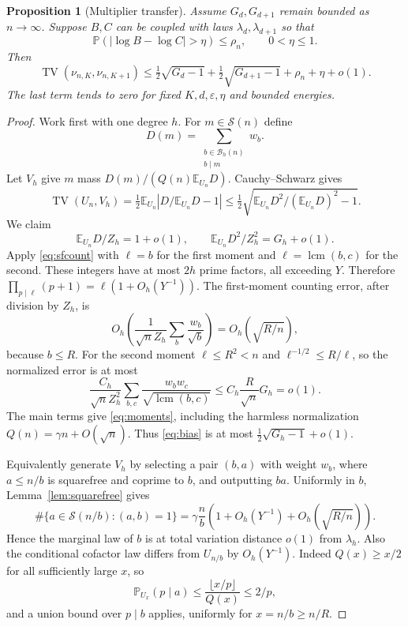 \documentclass[11pt]{article}
\newtheorem{proposition}[theorem]{Proposition}
\theoremstyle{remark}\newtheorem{remark}[theorem]{Remark}
\DeclareMathOperator{\TV}{TV}
\DeclareMathOperator{\lcm}{lcm}
\newcommand{\E}{\mathbb E}
\newcommand{\Prob}{\mathbb P}
\newcommand{\sfset}{\mathcal S}
\begin{document}
\begin{proposition}[Multiplier transfer]\label{prop:transfer}
Assume $G_d,G_{d+1}$ remain bounded as $n\to\infty$. Suppose $B,C$ can be coupled with laws $\lambda_d,\lambda_{d+1}$ so that
\[
 \Prob(|\log B-\log C|>\eta)\le\rho_n,
 \qquad 0<\eta\le1.
\]
Then
\begin{equation}\label{eq:transfer}
 \TV(\nu_{n,K},\nu_{n,K+1})
 \le\tfrac12\sqrt{G_d-1}+\tfrac12\sqrt{G_{d+1}-1}
       +\rho_n+\eta+o(1).
\end{equation}
The last term tends to zero for fixed $K,d,\varepsilon,\eta$ and bounded energies.
\end{proposition}
\begin{proof}
Work first with one degree $h$. For $m\in\sfset(n)$ define
\[
 D(m)=\sum_{\substack{b\in\mathcal B_h(n)\\b\mid m}}w_b.
\]
Let $V_h$ give $m$ mass $D(m)/(Q(n)\E_{U_n}D)$. Cauchy--Schwarz gives
\begin{equation}\label{eq:bias}
 \TV(U_n,V_h)
 =\tfrac12\E_{U_n}\left|D/\E_{U_n}D-1\right|
 \le\tfrac12\sqrt{\E_{U_n}D^2/(\E_{U_n}D)^2-1}.
\end{equation}
We claim
\begin{equation}\label{eq:moments}
 \E_{U_n}D/Z_h=1+o(1),\qquad
 \E_{U_n}D^2/Z_h^2=G_h+o(1).
\end{equation}
Apply \eqref{eq:sfcount} with $\ell=b$ for the first moment and $\ell=\lcm(b,c)$ for the second. These integers have at most $2h$ prime factors, all exceeding $Y$. Therefore $\prod_{p\mid\ell}(p+1)=\ell(1+O_h(Y^{-1}))$. The first-moment counting error, after division by $Z_h$, is
\[
 O_h\left(\frac1{\sqrt n Z_h}\sum_b\frac{w_b}{\sqrt b}\right)
 =O_h(\sqrt{R/n}),
\]
because $b\le R$. For the second moment $\ell\le R^2<n$ and $\ell^{-1/2}\le R/\ell$, so the normalized error is at most
\[
 \frac{C_h}{\sqrt n Z_h^2}\sum_{b,c}\frac{w_bw_c}{\sqrt{\lcm(b,c)}}
 \le C_h\frac R{\sqrt n}G_h=o(1).
\]
The main terms give \eqref{eq:moments}, including the harmless normalization $Q(n)=\gamma n+O(\sqrt n)$. Thus \eqref{eq:bias} is at most $\frac12\sqrt{G_h-1}+o(1)$.

Equivalently generate $V_h$ by selecting a pair $(b,a)$ with weight $w_b$, where $a\le n/b$ is squarefree and coprime to $b$, and outputting $ba$. Uniformly in $b$, Lemma~\ref{lem:squarefree} gives
\[
 \#\{a\in\sfset(n/b):(a,b)=1\}
 =\gamma\frac nb\left(1+O_h(Y^{-1})+O_h(\sqrt{R/n})\right).
\]
Hence the marginal law of $b$ is at total variation distance $o(1)$ from $\lambda_h$. Also the conditional cofactor law differs from $U_{n/b}$ by $O_h(Y^{-1})$. Indeed $Q(x)\ge x/2$ for all sufficiently large $x$, so
\[
 \Prob_{U_x}(p\mid a)\le\frac{\lfloor x/p\rfloor}{Q(x)}\le 2/p,
\]
and a union bound over $p\mid b$ applies, uniformly for $x=n/b\ge n/R$.


\end{proof}
\end{document}
